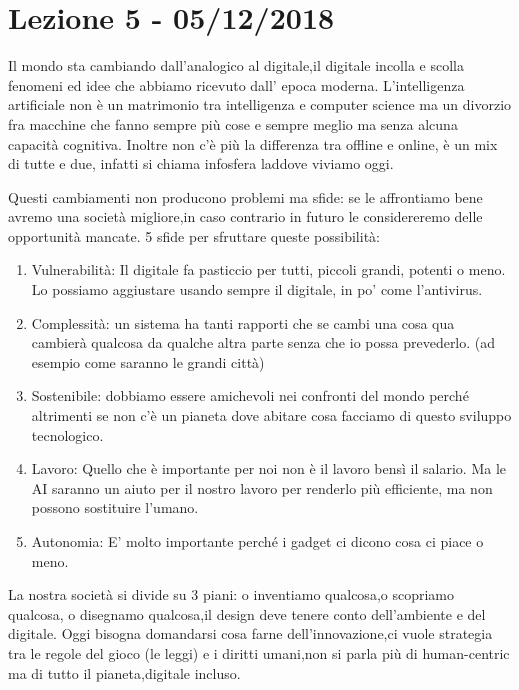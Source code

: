 \documentclass[a4page, 11pt]{article}
\begin{document}
\section*{Lezione 5 - 05/12/2018}

Il mondo sta cambiando dall'analogico al digitale,il digitale
incolla e scolla fenomeni ed idee che abbiamo ricevuto dall'
epoca moderna.
L'intelligenza artificiale non è un matrimonio tra intelligenza e computer
science ma un divorzio fra macchine che fanno sempre più cose e sempre
meglio ma senza alcuna capacità cognitiva.
Inoltre non c'è più la differenza tra offline e online, è un mix
di tutte e due, infatti si chiama infosfera laddove viviamo oggi.

Questi cambiamenti non producono problemi ma sfide: se le affrontiamo
bene avremo una società migliore,in caso contrario in futuro 
le considereremo delle opportunità mancate.
5 sfide per sfruttare queste possibilità:

\begin{enumerate}
	\def\labelenumi{\arabic{enumi})}
	 
	\item
	Vulnerabilità: Il digitale fa pasticcio per tutti, piccoli grandi,
	potenti o meno. Lo possiamo aggiustare usando sempre il digitale, in
	po' come l'antivirus.
	\item
	Complessità: un sistema ha tanti rapporti che se cambi una cosa qua
	cambierà qualcosa da qualche altra parte senza che io possa
	prevederlo. (ad esempio come saranno le grandi città)
	\item
	Sostenibile: dobbiamo essere amichevoli nei confronti del mondo perché
	altrimenti se non c'è un pianeta dove abitare cosa facciamo di questo
	sviluppo tecnologico. 
	\item
	Lavoro: Quello che è importante per noi non è il lavoro bensì il
	salario. Ma le AI saranno un aiuto per il nostro lavoro per renderlo
	più efficiente, ma non possono sostituire l'umano.
	\item
	Autonomia: E' molto importante perché i gadget ci dicono cosa ci piace
	o meno.
\end{enumerate}

La nostra società si divide su 3 piani: o inventiamo qualcosa,o scopriamo qualcosa,
o disegnamo qualcosa,il design deve tenere conto dell'ambiente e del digitale.
Oggi bisogna domandarsi cosa farne dell'innovazione,ci vuole strategia tra le
regole del gioco (le leggi) e i diritti umani,non si parla più di human-centric 
ma di tutto il pianeta,digitale incluso.
\end{document}
